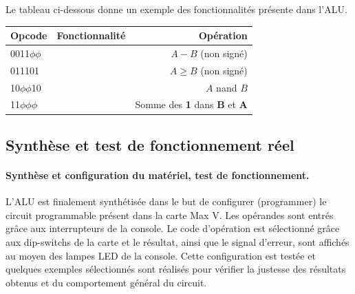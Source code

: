 \documentclass[a4paper]{article}
\begin{document}
\begin{tcolorbox}[colframe=Monokaimagenta,colback=white]
Le tableau ci-dessous donne un exemple des fonctionnalités présente dans l'ALU.
\begin{tabular}{ l | c |r }
    \hline
    Opcode           &  Fonctionnalité & Opération\\
    \hline
    0011$\phi\phi$ & \nameref{add_Sub} & $A-B$ (non signé) \\
    \hline
    011101         & \nameref{comp}    & $A \ge B$ (non signé) \\
    \hline
    10$\phi\phi$10   &\nameref{logique}& $A$ nand $B$\\
    \hline
    11$\phi\phi\phi$ & \nameref{custom}& Somme des \textbf{1} dans \textbf{B} et \textbf{A}
     
\end{tabular}


\end{tcolorbox}

\subsection{Synthèse et test de fonctionnement réel}
\paragraph{Synthèse et configuration du matériel, test de fonctionnement.}
L’ALU est finalement synthétisée dans le but de configurer (programmer) le circuit programmable présent dans la carte Max V. Les opérandes sont entrés grâce aux interrupteurs de la console. Le code d’opération est sélectionné grâce aux dip-switchs de la carte et le résultat, ainsi que le signal d’erreur, sont affichés au moyen des lampes LED de la console. Cette configuration est testée et quelques exemples sélectionnés sont réalisés pour vérifier la justesse des résultats obtenus et du comportement général du circuit.
\end{document}
